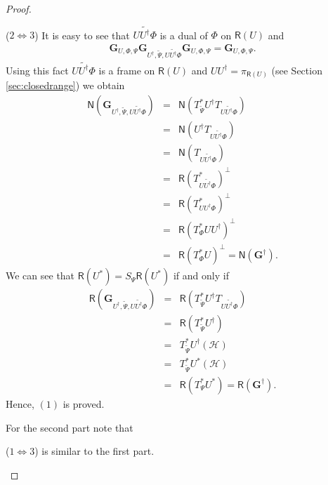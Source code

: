 \documentclass{birkjour}
\theoremstyle{definition}
\theoremstyle{remark}
\numberwithin{equation}{section}
\newcommand{\range}[1]{\mathsf{R}\left( #1 \right)}
\newcommand{\kernel}[1]{\mathsf{N}\left( #1 \right)}
\def\Hil{\mathcal{H}}
\begin{document}
\begin{proof}
\begin{enumerate}
($2\Leftrightarrow 3$) It is easy to see that $\widetilde{UU^{\dagger}\Phi}$ is a dual of $\Phi$ on $\range{U}$ and
\begin{eqnarray*} \mathbf{G}_{U,\Phi,\Psi}\mathbf{G}_{U^{\dagger},\widetilde{\Psi},\widetilde{UU^{\dagger}\Phi}}\mathbf{G}_{U,\Phi,\Psi}=\mathbf{G}_{U,\Phi,\Psi}.\end{eqnarray*}
Using this fact $\widetilde{UU^{\dagger}\Phi}$ is a frame on $\range{U}$ and $UU^{\dagger}=\pi_{\range{U}}$ (see Section \ref{sec:closedrange}) we obtain
\begin{eqnarray*}
\kernel{\mathbf{G}_{U^{\dagger},\widetilde{\Psi},\widetilde{UU^{\dagger}\Phi}}}&=&\kernel{T_{\widetilde{\Psi}}^*
U^{\dagger}T_{\widetilde{UU^{\dagger}\Phi}}}\\
&=&\kernel{
U^{\dagger}T_{\widetilde{UU^{\dagger}\Phi}}}\\
&=&\kernel{
T_{\widetilde{UU^{\dagger}\Phi}}}\\
&=&\range{T_{\widetilde{UU^{\dagger}\Phi}}^*}^{\perp}\\
&=&\range{T_{UU^{\dagger}\Phi}^*}^{\perp}\\
&=&\range{T_{\Phi}^*UU^{\dagger}}^{\perp}\\
&=&\range{T_{\Phi}^*U}^{\perp}=\kernel{\mathbf{G}^{\dagger}}.
\end{eqnarray*}
We can see that $\range{U^*}=S_{\Psi}\range{U^*}$ if and only if
\begin{eqnarray*}
\range{\mathbf{G}_{U^{\dagger},\widetilde{\Psi},\widetilde{UU^{\dagger}\Phi}}}&=&
\range{T_{\widetilde{\Psi}}^*
U^{\dagger}T_{\widetilde{UU^{\dagger}\Phi}}}\\
&=&\range{T_{\widetilde{\Psi}}^*
U^{\dagger}}\\
&=&T_{\widetilde{\Psi}}^*
U^{\dagger}(\Hil)\\
&=&T_{\widetilde{\Psi}}^*
U^{*}(\Hil)\\
&=&\range{T_{\Psi}^*
U^{*}}
=\range{\mathbf{G}^{\dagger}}.
\end{eqnarray*}
Hence, $(1)$ is proved.

For the second part note that

 ($1\Leftrightarrow 3$) is similar to the first part.


\end{enumerate}
\end{proof}
\end{document}

